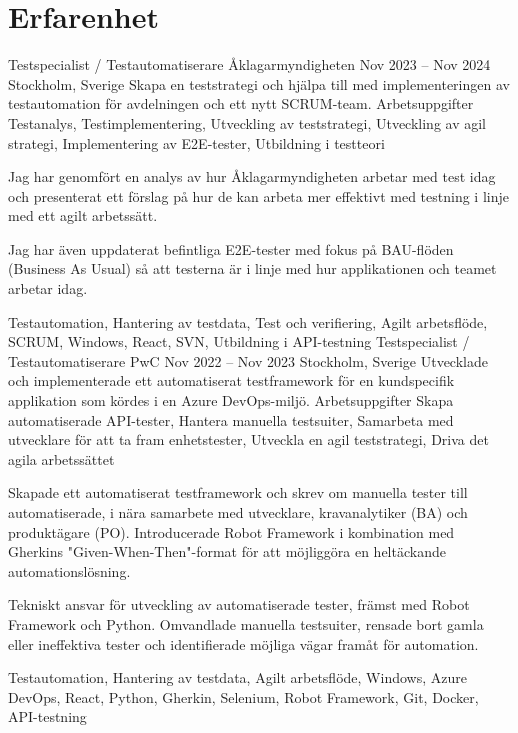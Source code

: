 \documentclass{sobCV}[2015/09/08]
\begin{document}
\section{Erfarenhet}
   \experiencenode
   {Testspecialist / Testautomatiserare}
   {Åklagarmyndigheten}
   {Nov 2023 -- Nov 2024}
   {Stockholm, Sverige}{
       Skapa en teststrategi och hjälpa till med implementeringen av testautomation för avdelningen och ett nytt SCRUM-team.
   }
   {Arbetsuppgifter}{
       Testanalys,
       Testimplementering,
       Utveckling av teststrategi,
       Utveckling av agil strategi,
       Implementering av E2E-tester,
       Utbildning i testteori
 }{
      {
       Jag har genomfört en analys av hur Åklagarmyndigheten arbetar med test idag och presenterat ett förslag på hur de kan arbeta mer effektivt med testning i linje med ett agilt arbetssätt.

       Jag har även uppdaterat befintliga E2E-tester med fokus på BAU-flöden (Business As Usual) så att testerna är i linje med hur applikationen och teamet arbetar idag.
     }
 }{
     Testautomation,
     Hantering av testdata,
     Test och verifiering,
     Agilt arbetsflöde,
     SCRUM,
     Windows,
     React,
     SVN,
     Utbildning i API-testning
}
\experiencenode
   {Testspecialist / Testautomatiserare}
   {PwC}
   {Nov 2022 -- Nov 2023}
   {Stockholm, Sverige}{
       Utvecklade och implementerade ett automatiserat testframework för en kundspecifik applikation som kördes i en Azure DevOps-miljö.
   }
   {Arbetsuppgifter}{
       Skapa automatiserade API-tester, 
       Hantera manuella testsuiter,
       Samarbeta med utvecklare för att ta fram enhetstester,
       Utveckla en agil teststrategi,
       Driva det agila arbetssättet
 }{
      {
         Skapade ett automatiserat testframework och skrev om manuella tester till automatiserade, i nära samarbete med utvecklare, kravanalytiker (BA) och produktägare (PO). Introducerade Robot Framework i kombination med Gherkins "Given-When-Then"-format för att möjliggöra en heltäckande automationslösning.

         Tekniskt ansvar för utveckling av automatiserade tester, främst med Robot Framework och Python. Omvandlade manuella testsuiter, rensade bort gamla eller ineffektiva tester och identifierade möjliga vägar framåt för automation.
     }
 }{
       Testautomation,
       Hantering av testdata,
       Agilt arbetsflöde, 
       Windows, 
       Azure DevOps, 
       React, 
       Python, 
       Gherkin, 
       Selenium, 
       Robot Framework,
       Git, 
       Docker, 
       API-testning 
}
\end{document}
